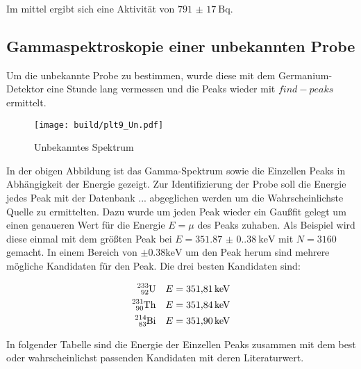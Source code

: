 Im mittel ergibt sich eine Aktivität von $\qty{791(17)}{\becquerel}$.

\subsection{Gammaspektroskopie einer unbekannten Probe}
Um die unbekannte Probe zu bestimmen, wurde diese mit dem Germanium-Detektor eine Stunde lang vermessen und die Peaks wieder mit $find-peaks$ ermittelt. 

\begin{figure}[H]
	\centering
	\texttt{[image: build/plt9\_Un.pdf]}
	\caption{Unbekanntes Spektrum}
	\label{fig:Un_spektrum}
\end{figure}

In der obigen Abbildung ist das Gamma-Spektrum sowie die Einzellen Peaks in Abhängigkeit der Energie gezeigt. 
Zur Identifizierung der Probe soll die Energie jedes Peak mit der Datenbank ... abgeglichen werden um die Wahrscheinlichste Quelle zu ermittelten. 
Dazu wurde um jeden Peak wieder ein Gaußfit gelegt um einen genaueren Wert für die Energie $E=\mu$ des Peaks zuhaben. 
Als Beispiel wird diese einmal mit dem größten Peak bei $E=\qty{351.87(0.38)}{\kilo\eV}$ mit $N=3160$ gemacht. 
In einem Bereich von $\pm 0.38\unit{\kilo\eV}$ um den Peak herum sind mehrere mögliche Kandidaten für den Peak.
Die drei besten Kandidaten sind: 

\begin{align*}
	\ce{^{233}_{92}U}&  &E=\qty{351.81}{\kilo\eV}\\
	\ce{^{231}_{90}Th}& &E=\qty{351.84}{\kilo\eV}\\
	\ce{^{214}_{83}Bi}& &E=\qty{351.90}{\kilo\eV}\\
\end{align*}

In folgender Tabelle sind die Energie der Einzellen Peaks zusammen mit dem best oder wahrscheinlichst passenden Kandidaten mit deren Literaturwert. 

